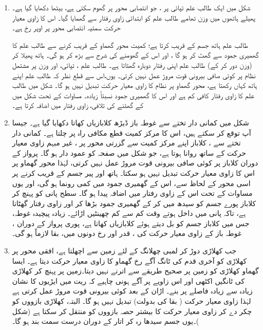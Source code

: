 \begin{enumerate}[1.]
\item
 \quad
شکل  میں ایک طالب علم   تپائی  پر ، جو انتصابی محور پر گھوم سکتی ہے، بیٹھا دکھایا گیا ہے۔ پھیلے  ہاتھوں میں   وزن تھامے طالب علم کو ابتدائی زاوی رفتار  سے گھمایا گیا۔ اس کا زاوی معیار حرکت سمتیہ  انتصابی محور پر اوپر رخ ہے۔

طالب علم ہاتھ جسم کے قریب کرتا ہے؛ کمیت محور گھماو کے قریب کرنے سے    طالب علم  کا گھمیری جمود  سے گھٹ کر  ہو گا ، اور اس کے گھومنے کی شرح  سے  بڑھ کر  ہو گی۔  ہاتھ  پھیلا کر (وزن دور کر کے)  طالب علم اپنی رفتار  دوبارہ گھٹاتا ہے۔
 طالب علم ، تپائی، اور وزن  پر مشتمل نظام پر کوئی صافی بیرونی قوت مروڑ عمل نہیں کرتی۔ یوں،اس سے قطع نظر کہ طالب علم اپنے ہاتھ کہاں رکھتا ہے،  محور گھماو پر  نظام  کا  زاوی معیار حرکت تبدیل نہیں ہو گا۔ شکل  میں  طالب علم کا زاوی رفتار  کافی کم ہے اور اس کا گھمیری جمود    نسبتاً زیادہ۔ مساوات   کے تحت شکل  میں     کے گھٹنے  کی تلافی،   زاوی رفتار  میں اضافہ کرتا ہے۔
 \item
 \quad
 شکل  میں کمانی دار تختے  سے غوطہ باز      ڈیڑھ کلابازیاں کھاتا دکھایا گیا ہے۔ جیسا آپ توقع کر سکتے ہیں، اس کا  مرکز کمیت قطع مکافی راہ پر چلتا ہے۔ کمانی دار تختے سے   ،  کلاباز  اپنے  مرکز کمیت  سے گزرتی محور  پر ، غیر   مبہم زاوی معیار حرکت   کے ساتھ روانا ہوتا ہے، جو شکل  میں صفحہ کو عمود دار ہو گا۔ پرواز کے دوران کلاباز پر کوئی صافی بیرونی قوت مروڑ عمل نہیں کرتی، لہٰذا  محور گھماو پر اس کا زاوی معیار حرکت تبدیل نہیں ہو سکتا۔ ہاتھ اور پیر جسم کے قریب کرنے پر اسی محور کے لحاظ سے، اس کے  گھمیری جمود   میں کمی رونما ہو گی،  اور یوں مساوات  کے تحت  اس کے  زاوی رفتار  میں اضافہ پیدا ہو گا۔ سطح پانی کو پہنچ کر کلاباز  پورے جسم کو سیدھ میں کر کے   گھمیری جمود بڑھا کر اور زاوی رفتار گھٹاتا ہے، تاکہ پانی میں  داخل ہوتے وقت کم سے کم چھینٹیں اڑائے۔ زیادہ پیچیدہ غوطہ،  جس میں کلاباز جسم کو بل دیتے ہوئے کلابازیاں کھاتا ہے، پوری پرواز    کے دوران ، غوطہ باز کے زاوی معیار حرکت  کی ، قدر اور رخ دونوں میں، بقا لازماً ہو گی۔
 \item
{}\quad
جب کھلاڑی دوڑ کر لمبی چھلانگ  کے لئے زمین سے اچھلتا ہے،  افقی محور پر کھلاڑی کو آخری قدم کی ٹانگ آگے     رخ  گھماو کا زاوی معیار حرکت  دیتا ہے۔ ایسا گھماو کھلاڑی کو زمین پر  صحیح   طریقے سے اترنے نہیں دیتا۔زمین پر پہنچ کر کھلاڑی کی ٹانگیں  اکٹھی اور   اس زاویے پر آگے ہونی چاہیے  کہ ریت میں ایڑیوں کا نشان زیادہ سے زیادہ فاصلے پر بنے۔ اڑان کے بعد کوئی بیرونی قوت مروڑ عمل کرتی ہے لہٰذا  زاوی معیار حرکت  ( بقا کی بدولت)  تبدیل نہیں ہو گا۔ البتہ، کھلاڑی  بازووں کو   چکر دے کر زاوی  معیار حرکت کا بیشتر حصہ بازووں کو منتقل کر سکتا ہے (شکل )۔یوں جسم  سیدھا رہ کر اتار کے دوران  درست سمت بند ہو گا۔
 \end{enumerate}
 
